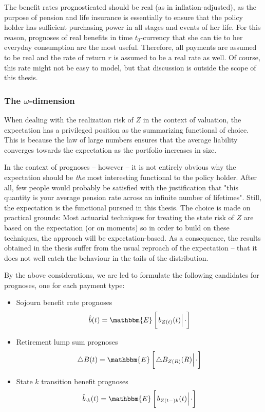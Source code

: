 \documentclass{article}
\newcommand{\1}[1]{\mathbbm{1}_{\left\lbrace #1 \right\rbrace}}
\newcommand{\econd}[2][def]{\mathbbm{E} \left[ \left. #1 \right| #2 \right]}
\theoremstyle{break}
\theoremstyle{remark}
\numberwithin{equation}{section}
\begin{document}
The benefit rates prognosticated should be real (as in inflation-adjusted), as the purpose of pension and life insurance is essentially to ensure that the policy holder has sufficient purchasing power in all stages and events of her life. For this reason, prognoses of real benefits in time $t_0$-currency that she can tie to her everyday consumption are the most useful. Therefore, all payments are assumed to be real and the rate of return $r$ is assumed to be a real rate as well. Of course, this rate might not be easy to model, but that discussion is outside the scope of this thesis.

\subsubsection{The $\omega$-dimension}

When dealing with the realization risk of $Z$ in the context of valuation, the expectation has a privileged position as the summarizing functional of choice. This is because the law of large numbers ensures that the average liability converges towards the expectation as the portfolio increases in size.

In the context of prognoses -- however -- it is not entirely obvious why the expectation should be \textit{the} most interesting functional to the policy holder. After all, few people would probably be satisfied with the justification that "this quantity is your average pension rate across an infinite number of lifetimes". Still, the expectation is the functional pursued in this thesis. The choice is made on practical grounds: Most actuarial techniques for treating the state risk of $Z$ are based on the expectation (or on moments) so in order to build on these techniques, the approach will be expectation-based. As a consequence, the results obtained in the thesis suffer from the usual reproach of the expectation -- that it does not well catch the behaviour in the tails of the distribution.

By the above considerations, we are led to formulate the following candidates for prognoses, one for each payment type:

\begin{itemize}
    \item Sojourn benefit rate prognoses
    \begin{align*}
        \hat{b}(t) = \econd[b_{Z(t)}(t)]{\cdot}
    \end{align*}
    \item Retirement lump sum prognoses
    \begin{align*}
        \triangle B(t) = \econd[\triangle B_{Z(R)}(R)]{\cdot}
    \end{align*}
    \item State $k$ transition benefit prognoses
    \begin{align*}
        \hat{b}_{\cdot k}(t) = \econd[b_{Z(t-)k}(t)]{\cdot}
    \end{align*}
\end{itemize}
\end{document}
